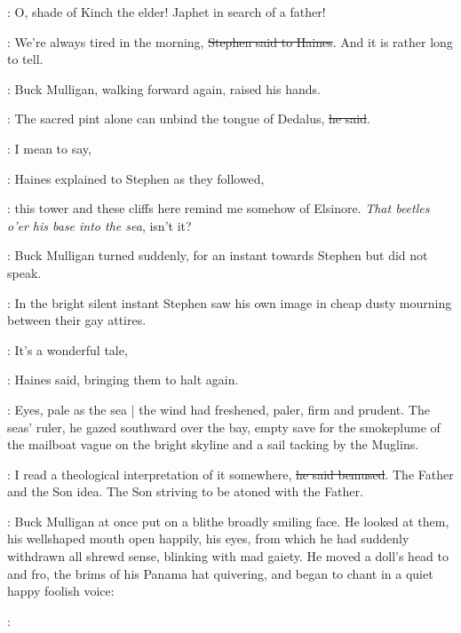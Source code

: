 \Mulligan:
O, shade of Kinch the elder!
Japhet in search of a father!

\Stephen:
We're always tired in the morning,
\sout{Stephen said to Haines}.
And it is rather long to tell.

:
Buck Mulligan,
walking forward again,
raised his hands.

\Mulligan:
The sacred pint alone can unbind the tongue of Dedalus,
\sout{he said}.

\Haines:
I mean to say,

:
Haines explained to Stephen as they followed,

\Haines:
this tower and these cliffs here
remind me somehow of Elsinore.
\emph{That beetles o'er his base into the sea}, isn't it?


:
Buck Mulligan turned suddenly,
for an instant
towards Stephen but did not speak.

:
In the bright silent instant
Stephen saw his own image
in cheap dusty mourning
between their gay attires.

\Haines:
It's a wonderful tale,

:
Haines said,
bringing them to halt again.

:
Eyes,
pale as the sea |
the wind had freshened,
paler, firm and prudent.
The seas' ruler,
he gazed southward over the bay,
empty save for the smokeplume of the mailboat
vague on the bright skyline
and a sail tacking by the Muglins.

\Haines:
I read a theological interpretation of it somewhere,
\sout{he said bemused}.
The Father and the Son idea.
The Son striving to be atoned with the Father.

:
Buck Mulligan at once put on a blithe broadly smiling face.
He looked at them,
his wellshaped mouth open happily,
his eyes,
from which he had suddenly withdrawn all shrewd sense,
blinking with mad gaiety.
He moved a doll's head to and fro,
the brims of his Panama hat quivering,
and began to chant in a quiet happy foolish voice:

\Mulligan:
\begin{verse}
\end{verse}

